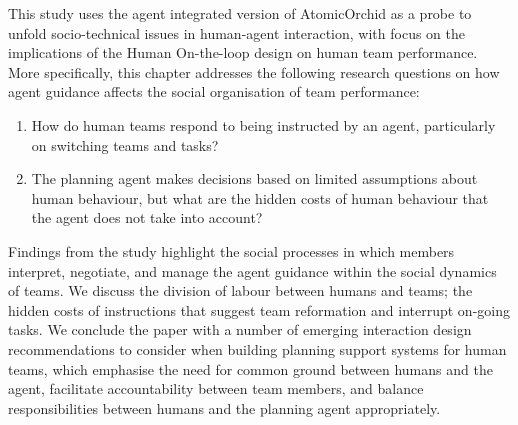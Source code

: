 This study uses the agent integrated version of AtomicOrchid as a probe to unfold socio-technical issues in human-agent interaction, with focus on the implications of the Human On-the-loop design on human team performance. More specifically, this chapter addresses the following research questions on how agent guidance affects the social organisation of team performance:\\

\begin{enumerate}
\item How do human teams respond to being instructed by an agent, particularly on switching teams and tasks?\\
\item The planning agent makes decisions based on limited assumptions about human behaviour, but what are the hidden costs of human behaviour that the agent does not take into account?\\
\end{enumerate}

Findings from the study highlight the social processes in which members interpret, negotiate, and manage the agent guidance within the social dynamics of teams. We discuss the division of labour between humans and teams; the hidden costs of instructions that suggest team reformation and interrupt on-going tasks. We conclude the paper with a number of emerging interaction design recommendations to consider when building planning support systems for human teams, which emphasise the need for common ground between humans and the agent, facilitate accountability between team members, and balance responsibilities between humans and the planning agent appropriately.\\



